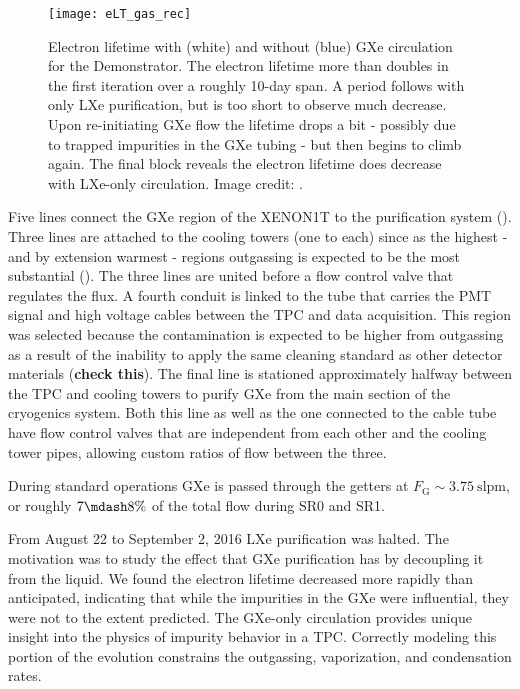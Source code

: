 \begin{figure}
\centering
\texttt{[image: eLT\_gas\_rec]}
\caption{Electron lifetime with (white) and without (blue) GXe circulation for the Demonstrator.  The electron lifetime more than doubles
in the first iteration over a roughly 10-day span.  A period follows with
only LXe purification, but is too short to observe much decrease.  Upon re-initiating GXe flow the lifetime drops a bit - possibly due to
trapped impurities in the GXe tubing - but then begins to climb again.  The final block reveals the electron lifetime does
decrease with LXe-only circulation.  Image credit: .}
\label{fig:electron_lifetime_model_gxe_demonstrator}
\end{figure}

Five lines connect the GXe region of the XENON1T to the purification system ().  Three lines are attached to
the cooling towers (one to each) since as the highest - and by extension warmest - regions outgassing is expected to be the most
substantial ().  The three lines are united before a flow control valve
that regulates the flux.  A fourth conduit is linked to the tube that carries the PMT signal and high voltage cables between the TPC and
data acquisition.  This region was selected because the contamination is expected to be higher from outgassing as a result of the
inability to apply the same cleaning standard as other detector materials (\textbf{check this}).  The final line is stationed
approximately halfway between the TPC and cooling towers to purify GXe from the main section of the cryogenics system.  Both this line as
well
as the one connected to the cable tube have flow control valves that are independent from each other and the cooling tower pipes, allowing
custom ratios of flow between the three.

During standard operations GXe is passed through the getters at $F_{\mathrm{G}} {\sim} 3.75\ \mathrm{slpm}$, or roughly $7 \mdash 8\%$ of
the total flow during SR0 and SR1.

From August 22 to September 2, 2016 LXe purification was halted.  The motivation was to study the effect that GXe purification has by
decoupling it from the liquid.  We found the electron lifetime decreased more rapidly than anticipated, indicating that while the
impurities in the GXe were influential, they were not to the extent predicted.  The GXe-only circulation provides unique insight into
the physics of impurity behavior in a TPC.  Correctly modeling this portion of the evolution constrains the outgassing, vaporization,
and condensation rates.



